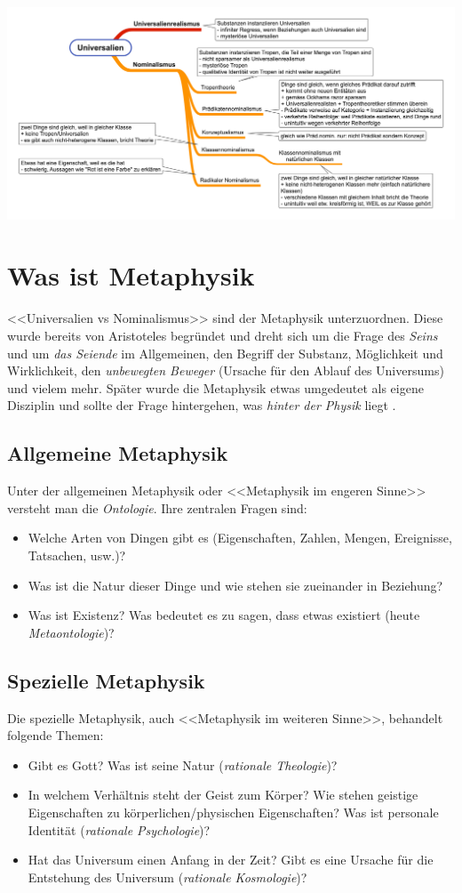 \documentclass[../main.tex]{subfiles}
\begin{document}
\includegraphics[width=\textwidth]{images/Universalien_Uebersicht.png}

\section{Was ist Metaphysik} 
<<Universalien vs Nominalismus>> sind der Metaphysik unterzuordnen. Diese wurde bereits von Aristoteles begründet und dreht sich um die Frage des \textit{Seins} und um \textit{das Seiende} im Allgemeinen, den Begriff der Substanz, Möglichkeit und Wirklichkeit, den \textit{unbewegten Beweger} (Ursache für den Ablauf des Universums) und vielem mehr. Später wurde die Metaphysik etwas umgedeutet als eigene Disziplin und sollte der Frage hintergehen, was \textit{hinter der Physik} liegt	. 

\subsection{Allgemeine Metaphysik}
Unter der allgemeinen Metaphysik oder <<Metaphysik im engeren Sinne>> versteht man die \textit{Ontologie}. Ihre zentralen Fragen sind:
\begin{itemize}
	\item Welche Arten von Dingen gibt es (Eigenschaften, Zahlen, Mengen, Ereignisse, Tatsachen, usw.)?
	\item Was ist die Natur dieser Dinge und wie stehen sie zueinander in Beziehung?
	\item Was ist Existenz? Was bedeutet es zu sagen, dass etwas existiert (heute \textit{Metaontologie})?
\end{itemize}

\subsection{Spezielle Metaphysik}
Die spezielle Metaphysik, auch <<Metaphysik im weiteren Sinne>>, behandelt folgende Themen:
\begin{itemize}
	\item Gibt es Gott? Was ist seine Natur (\textit{rationale Theologie})?
	\item In welchem Verhältnis steht der Geist zum Körper? Wie stehen geistige Eigenschaften zu körperlichen/physischen Eigenschaften? Was ist personale Identität (\textit{rationale Psychologie})?
	\item Hat das Universum einen Anfang in der Zeit? Gibt es eine Ursache für die Entstehung des Universum (\textit{rationale Kosmologie})?
\end{itemize}
\end{document}
